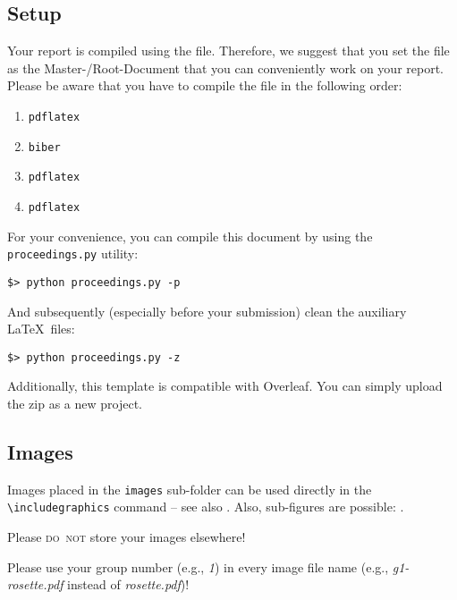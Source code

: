 \newpage
\subsection*{Setup}
\begin{samepage}
    Your report is compiled using the \texttt{\rootDocument} file. Therefore, we suggest that you set the file \texttt{\rootDocument} as the Master-/Root-Document that you can conveniently work on your report.
    Please be aware that you have to compile the \texttt{\rootDocument} file in the following order:
    
    \begin{enumerate}
        \item \verb|pdflatex| \rootDocument
        \item \verb|biber| \rootName
        \item \verb|pdflatex| \rootDocument
        \item \verb|pdflatex| \rootDocument
    \end{enumerate}
\end{samepage}


For your convenience, you can compile this document by using the \texttt{proceedings.py} utility:

\begin{center}
    \verb|$> python proceedings.py -p|
\end{center}

And subsequently (especially before your submission) clean the auxiliary \LaTeX\ files:

\begin{center}
    \verb|$> python proceedings.py -z|
\end{center}

Additionally, this template is compatible with Overleaf. You can simply upload the zip as a new project.



\subsection*{Images}
Images placed in the \texttt{images} sub-folder can be used directly in the \texttt{\textbackslash includegraphics} command -- see also . Also, sub-figures are possible: .

Please \textsc{do~not} store your images elsewhere! 

Please use your group number (e.g., \textit{1}) in every image file name (e.g., \textit{g1-rosette.pdf} instead of \textit{rosette.pdf})!

